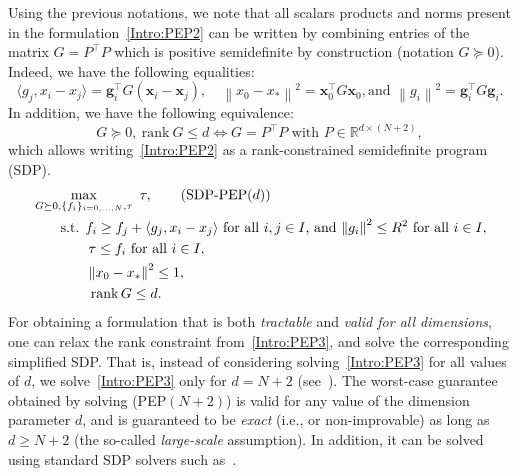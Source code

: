 \documentclass[11pt,a4paper]{article}
\newcommand{\normsq}[1]{{\left\lVert#1\right\rVert}^2}
\newcommand{\inner}[2]{{\langle #1, #2\rangle}}
\DeclareMathOperator{\rank}{rank}
\newcommand{\bx}{\mathbf{x}}
\newcommand{\bg}{\mathbf{g}}
\begin{document}
Using the previous notations, we note that all scalars products and norms present in the formulation~\eqref{Intro:PEP2} can be written by combining entries of the matrix $G=P^{\top\!}P$ which is positive semidefinite by construction (notation $G\succeq 0$). Indeed, we have the following equalities:
\[\inner{g_j}{x_i-x_j}=\bg_i^{\top\!} G(\bx_i-\bx_j),\quad \normsq{x_0-x_*}=\bx_0^{\top\!} G\bx_0, \text{and } \normsq{g_i}=\bg_i^{\top\!} G\bg_i.\]
In addition, we have the following equivalence:
\[ G\succeq 0, \ \mathrm{rank}\ G\leq d \Leftrightarrow G=P^\top P \text{ with } P\in\mathbb{R}^{d\times (N+2)},\]
which allows writing~\eqref{Intro:PEP2} as a rank-constrained semidefinite program (SDP).
\begin{align}
&\max_{G\succeq 0, \{f_i\}_{i=0,\hdots,N},\tau} \ \tau,  \tag{SDP-PEP$(d)$}\label{Intro:PEP3} \\
&\quad\quad \text{s.t. } f_i\geq f_j+\inner{g_j}{x_i-x_j}\text{ for all } i,j\in I\text{, and } \normsq{g_i}\leq R^2 \text{ for all }i\in I,  \notag\\
&\quad\quad\quad\quad    \tau \leq f_i\text{ for all }i\in I,\notag\\
&\quad\quad\quad\quad    \normsq{x_0-x_*}\leq 1\notag,\\
&\quad\quad\quad\quad \rank{G}\leq d\notag.
\end{align}
For obtaining a formulation that is both \emph{tractable} and \emph{valid for all dimensions}, one can relax the rank constraint from~\eqref{Intro:PEP3}, and solve the corresponding simplified SDP. That is, instead of considering solving~\eqref{Intro:PEP3} for all values of $d$, we solve~\eqref{Intro:PEP3} only for $d=N+2$ (see~\cite[Remark 3]{taylor2015exact}). The worst-case guarantee obtained by solving (PEP$(N+2)$) is valid for any value of the dimension parameter $d$, and is guaranteed to be \emph{exact} (i.e., or non-improvable) as long as $d\geq N+2$ (the so-called \emph{large-scale} assumption). In addition, it can be solved using standard SDP solvers such as~\cite{Article:Sedumi,Article:Mosek,Article:sdpt3}.\vspace{1cm}
\end{document}
